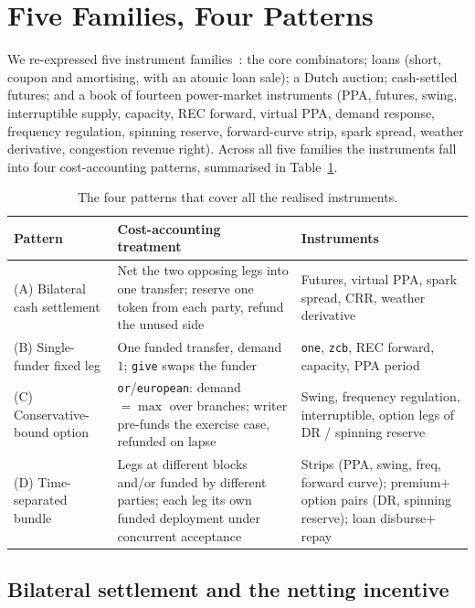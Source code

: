 \documentclass[11pt]{article}
\theoremstyle{definition}
\theoremstyle{plain}
\begin{document}
\section{Five Families, Four Patterns}\label{sec:instruments}

We re-expressed five instrument families~\cite{F1R3Fi}: the core combinators; loans (short, coupon and amortising,
with an atomic loan sale); a Dutch auction; cash-settled futures; and a book of fourteen power-market
instruments (PPA, futures, swing, interruptible supply, capacity, REC forward, virtual PPA, demand
response, frequency regulation, spinning reserve, forward-curve strip, spark spread, weather
derivative, congestion revenue right). Across all five families the instruments fall into four
cost-accounting patterns, summarised in Table~\ref{tab:patterns}.

\begin{table}[t]
\centering\small
\begin{tabular}{@{}p{}p{}p{}@{}}
\toprule
\textbf{Pattern} & \textbf{Cost-accounting treatment} & \textbf{Instruments} \\
\midrule
(A) Bilateral cash settlement & Net the two opposing legs into one transfer; reserve one token from
each party, refund the unused side & Futures, virtual PPA, spark spread, CRR, weather derivative \\
\addlinespace
(B) Single-funder fixed leg & One funded transfer, demand $1$; \texttt{give} swaps the funder &
\texttt{one}, \texttt{zcb}, REC forward, capacity, PPA period \\
\addlinespace
(C) Conservative-bound option & \texttt{or}/\texttt{european}: demand $=\max$ over branches; writer
pre-funds the exercise case, refunded on lapse & Swing, frequency regulation, interruptible, option
legs of DR / spinning reserve \\
\addlinespace
(D) Time-separated bundle & Legs at different blocks and/or funded by different parties; each leg its
own funded deployment under concurrent acceptance & Strips (PPA, swing, freq, forward curve);
premium$+$option pairs (DR, spinning reserve); loan disburse$+$repay \\
\bottomrule
\end{tabular}
\caption{The four patterns that cover all the realised instruments.}
\label{tab:patterns}
\end{table}

\subsection{Bilateral settlement and the netting incentive}
\end{document}
